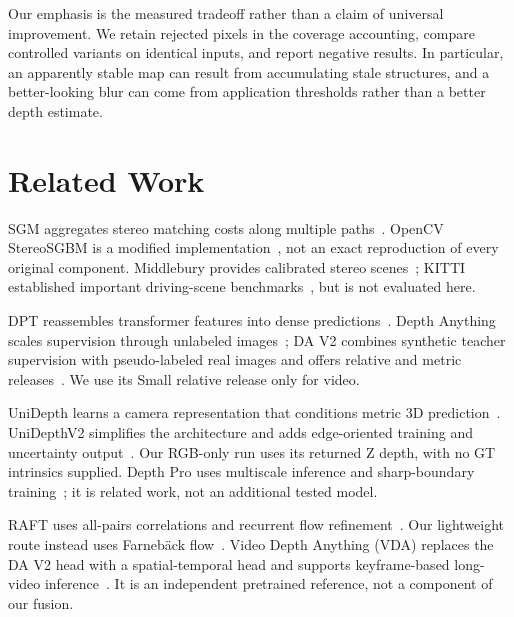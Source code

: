 \documentclass[10pt,twocolumn,letterpaper]{article}
\begin{document}
Our emphasis is the measured tradeoff rather than a claim of universal improvement. We retain rejected pixels in the coverage accounting, compare controlled variants on identical inputs, and report negative results. In particular, an apparently stable map can result from accumulating stale structures, and a better-looking blur can come from application thresholds rather than a better depth estimate.

\section{Related Work}
SGM aggregates stereo matching costs along multiple paths~\cite{sgm}. OpenCV StereoSGBM is a modified implementation~\cite{opencv}, not an exact reproduction of every original component. Middlebury provides calibrated stereo scenes~\cite{middlebury}; KITTI established important driving-scene benchmarks~\cite{kitti}, but is not evaluated here.

DPT reassembles transformer features into dense predictions~\cite{dpt}. Depth Anything scales supervision through unlabeled images~\cite{dav1}; DA V2 combines synthetic teacher supervision with pseudo-labeled real images and offers relative and metric releases~\cite{dav2}. We use its Small relative release only for video.

UniDepth learns a camera representation that conditions metric 3D prediction~\cite{unidepth}. UniDepthV2 simplifies the architecture and adds edge-oriented training and uncertainty output~\cite{unidepthv2}. Our RGB-only run uses its returned Z depth, with no GT intrinsics supplied. Depth Pro uses multiscale inference and sharp-boundary training~\cite{depthpro}; it is related work, not an additional tested model.

RAFT uses all-pairs correlations and recurrent flow refinement~\cite{raft}. Our lightweight route instead uses Farneb\"ack flow~\cite{farneback}. Video Depth Anything (VDA) replaces the DA V2 head with a spatial-temporal head and supports keyframe-based long-video inference~\cite{vda}. It is an independent pretrained reference, not a component of our fusion.
\end{document}
